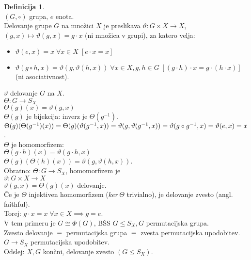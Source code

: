 \documentclass[a4paper, 12pt]{book}
\theoremstyle{definition}
\newtheorem{defn}[counter]{Definicija}
\theoremstyle{remark}
\begin{document}
\begin{defn} \text{} \\
  $(G, \circ)$ grupa, $e$ enota. \\
  Delovanje grupe $G$ na množici $X$ je preslikava $\vartheta: G \times X \to X$, \\
  $(g, x) \mapsto \vartheta(g, x) = g \cdot x$ (ni množica v grupi), za katero velja:
  \begin{itemize}
    \item $\vartheta(e, x) = x \; \forall x \in X \; [e \cdot x = x]$
    \item $\vartheta(g \circ h, x) = \vartheta(g, \vartheta(h, x)) \; \forall x \in X, g,h \in G \;
      [(g \cdot h) \cdot x = g \cdot (h \cdot x)]$ (ni asociativnost).
  \end{itemize}
\end{defn}
$\vartheta$ delovanje $G$ na $X$. \\
$\Theta: G \to S_X$ \\
$\Theta(g)(x) = \vartheta(g, x)$ \\
$\Theta(g)$ je bijekcija: inverz je $\Theta(g^{-1})$. \\
$\Theta(g)(\Theta(g^{-1})(x)) = \Theta(g)(\vartheta(g^{-1}, x)) = \vartheta(g, \vartheta(g^{-1}, x)) \\
= \vartheta(g \circ g^{-1}, x) = \vartheta(e, x) = x$. \\
$\Theta$ je homomorfizem: \\
$\Theta(g \cdot h)(x) = \vartheta(g \cdot h, x)$ \\
$\Theta(g)(\Theta(h)(x)) = \vartheta(g, \vartheta(h, x))$. \\
Obratno: $\Theta: G \to S_X$, homomorfizem je \\
$\vartheta: G \times X \to X$ \\
$\vartheta(g, x) = \Theta(g)(x)$ delovanje. \\
Če je $\Theta$ injektiven homomorfizem ($ker \, \Theta$ trivialno), je delovanje zvesto (angl. faithful). \\
Torej: $g \cdot x = x \; \forall x \in X \implies g = e$. \\
V tem primeru je $G \cong \Phi(G)$, BŠS $G \leq S_X, G$ permutacijska grupa. \\
Zvesto delovanje $\equiv$ permutacijska grupa $\equiv$ zvesta permutacijska upodobitev. \\
$G \to S_X$ permutacijska upodobitev. \\
Odslej: $X, G$ končni, delovanje zvesto $(G \leq S_X)$. \\
\end{document}
